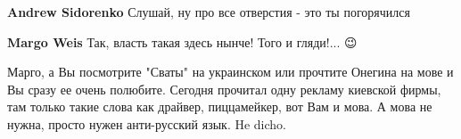\begin{itemize}
\begin{itemize}
 
\textbf{Andrew Sidorenko} Слушай, ну про все отверстия - это ты погорячился \Smiley[1.0][yellow]

 
\textbf{Margo Weis} Так, власть такая здесь нынче! Того и гляди!... 😉
\end{itemize}

 

Марго, а Вы посмотрите "Сваты" на украинском или прочтите Онегина на мове и Вы
сразу ее очень полюбите. Сегодня прочитал одну рекламу киевской фирмы, там
только такие слова как драйвер, пиццамейкер, вот Вам и мова. А мова не нужна,
просто нужен анти-русский язык. He dicho.
\end{itemize}

